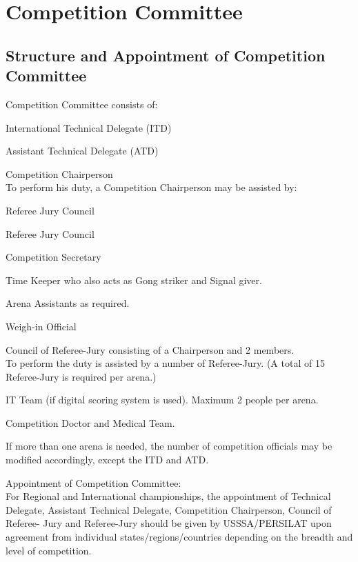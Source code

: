 \chapter{Competition Committee}\label{chp:competition_committee}

\section{Structure and Appointment of Competition Committee}\label{sec:structure_and_appointment_competition_committee}

\begin{legal}
\item Competition Committee consists of:
    \begin{legal}
    \item International Technical Delegate (ITD)
    \item Assistant Technical Delegate (ATD)
    \item Competition Chairperson \\
    To perform his duty, a Competition Chairperson may be assisted by:
        \begin{legal}
        \item Referee Jury Council
        \item Referee Jury Council
        \item Competition Secretary
        \item Time Keeper who also acts as Gong striker and Signal giver.
        \item Arena Assistants as required.
        \item Weigh-in Official
        \end{legal}
    \item Council of Referee-Jury consisting of a Chairperson and 2 members.\\
        To perform the duty is assisted by a number of Referee-Jury. 
        (A total of 15 Referee-Jury is required per arena.)
    \item IT Team (if digital scoring system is used). Maximum 2 people per arena.
    \item Competition Doctor and Medical Team.
    \end{legal}
    If more than one arena is needed, the number of competition officials may be 
    modified accordingly, except the ITD and ATD.
\item Appointment of Competition Committee: \\
For Regional and International championships, the appointment of Technical
Delegate, Assistant Technical Delegate, Competition Chairperson, Council of Referee-
Jury and Referee-Jury should be given by USSSA/PERSILAT upon agreement from individual
states/regions/countries depending on the breadth and level of competition.

\end{legal}

